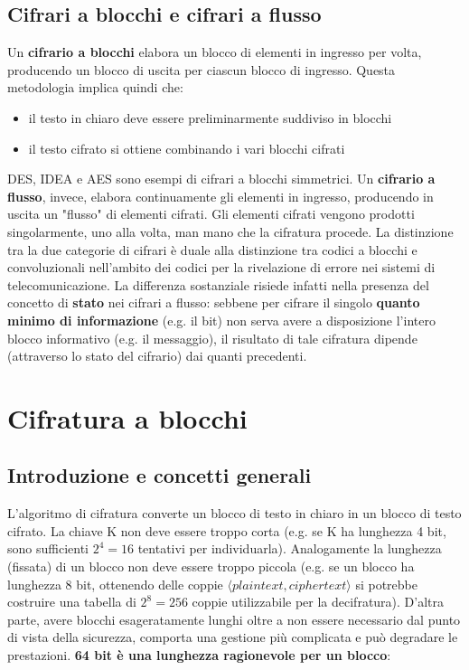 \subsection{Cifrari a blocchi e cifrari a flusso}
Un \textbf{cifrario a blocchi} elabora un blocco di elementi in ingresso per volta, producendo un blocco di uscita per ciascun blocco di ingresso. Questa metodologia implica quindi che:
\begin{itemize}
  \item il testo in chiaro deve essere preliminarmente suddiviso in blocchi
  \item il testo cifrato si ottiene combinando i vari blocchi cifrati
\end{itemize}
DES, IDEA e AES sono esempi di cifrari a blocchi simmetrici. Un \textbf{cifrario a flusso}, invece, elabora continuamente gli elementi in ingresso, producendo in uscita un "flusso" di elementi cifrati. Gli elementi cifrati vengono prodotti singolarmente, uno alla volta, man mano che la cifratura procede. La distinzione tra la due categorie di cifrari è duale alla distinzione tra codici a blocchi e convoluzionali nell'ambito dei codici per la rivelazione di errore nei sistemi di telecomunicazione. La differenza sostanziale risiede infatti nella presenza del concetto di \textbf{stato} nei cifrari a flusso: sebbene per cifrare il singolo \textbf{quanto minimo di informazione} (e.g. il bit) non serva avere a disposizione l'intero blocco informativo (e.g. il messaggio), il risultato di tale cifratura dipende (attraverso lo stato del cifrario) dai quanti precedenti.

\section{Cifratura a blocchi}

\subsection{Introduzione e concetti generali}
L’algoritmo di cifratura converte un blocco di testo in chiaro in un blocco di testo cifrato. La chiave K non deve essere troppo corta (e.g. se K ha lunghezza 4 bit, sono sufficienti $2^4 = 16$ tentativi per individuarla). Analogamente la lunghezza (fissata) di un blocco non deve essere troppo piccola (e.g. se un blocco ha lunghezza 8 bit, ottenendo delle coppie $\langle plaintext, ciphertext \rangle$ si potrebbe costruire una tabella di $2^8 = 256$ coppie utilizzabile per la decifratura).\newline 
D'altra parte, avere blocchi esageratamente lunghi oltre a non essere necessario dal punto di vista della sicurezza, comporta una gestione più complicata e può degradare le prestazioni. \textbf{64 bit è una lunghezza ragionevole per un blocco}: 

